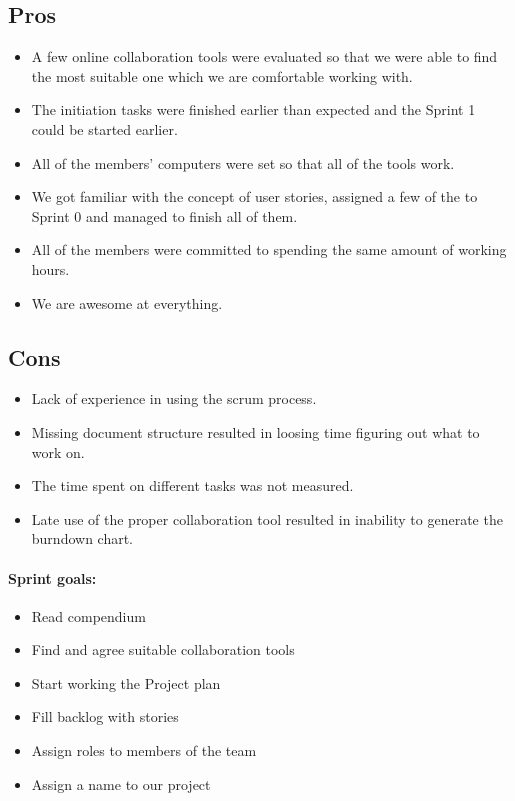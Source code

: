 \subsection{Pros}
\begin{itemize}
\item A few online collaboration tools were evaluated so that we were able to find the most suitable one which we are comfortable working with.
\item The initiation tasks were finished earlier than expected and the Sprint 1 could be started earlier.
\item All of the members' computers were set so that all of the tools work.
\item We got familiar with the concept of user stories, assigned a few of the to Sprint 0 and managed to finish all of them.
\item All of the members were committed to spending the same amount of working hours.
\item We are awesome at everything.
\end{itemize}

\subsection{Cons}
\begin{itemize}
\item Lack of experience in using the scrum process.
\item Missing document structure resulted in loosing time figuring out what to work on.
\item The time spent on different tasks was not measured.
\item Late use of the proper collaboration tool resulted in inability to generate the burndown chart.
\end{itemize}

\paragraph{Sprint goals:}
\begin{itemize}
    \item Read compendium
    \item Find and agree suitable collaboration tools
    \item Start working the Project plan
    \item Fill backlog with stories
    \item Assign roles to members of the team
    \item Assign a name to our project
\end{itemize}
